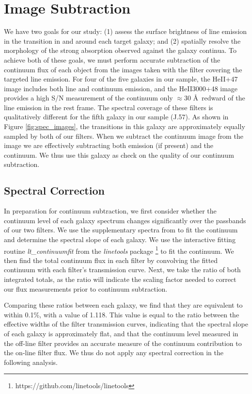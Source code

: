 \documentclass[twocolumn]{aastex62}
\begin{document}
\section{Image Subtraction}\label{sec.cont_sub}
We have two goals for our study: (1) assess the surface brightness of line emission in the  transition in and around each target galaxy; and (2) spatially resolve the morphology of the strong  absorption observed against the galaxy continua.
To achieve both of these goals, we must perform accurate subtraction of the continuum flux of each object from the images taken with the filter covering the targeted line emission. For four of the five galaxies in our sample, the HeII+47 image includes both line and continuum emission, and the HeII3000+48 image provides a high S/N measurement of the continuum only $\approx30$ \AA\ redward of the line emission in the rest frame. %
The spectral coverage of these filters is qualitatively different for the fifth galaxy in our sample (J.57).
As shown in Figure \ref{fig:spec_images}, the  transitions in this galaxy are approximately equally sampled by both of our filters. When we subtract the continuum image from the  image we are effectively subtracting both  emission (if present) and the continuum. We thus use this galaxy as check on the quality of our continuum subtraction.

\subsection{Spectral Correction}
In preparation for continuum subtraction, we first consider whether the continuum level of each galaxy spectrum changes significantly over the passbands of our two filters.
We use the supplementary spectra from \citet{Rubin_2014} to fit the continuum and determine the spectral slope of each galaxy. We use the interactive fitting routine \emph{lt\_continuumfit} from the \emph{linetools} package \citep{Prochaska2016}\footnote{https://github.com/linetools/linetools} to fit the continuum. We then find the total continuum flux in each filter by convolving the fitted continuum with each filter's transmission curve. Next, we take the ratio of both integrated totals, as the ratio will indicate the scaling factor needed to correct our flux measurements prior to continuum subtraction. 

Comparing these ratios between each galaxy, we find that they are equivalent to within 0.1\%, with a value of 1.118. This value is equal to the ratio between the effective widths of the filter transmission curves, indicating that the spectral slope of each galaxy is approximately flat, and that the continuum level measured in the off-line filter provides an accurate measure of the continuum contribution to the on-line filter flux.  We thus do not apply any spectral correction in the following analysis.
\end{document}
